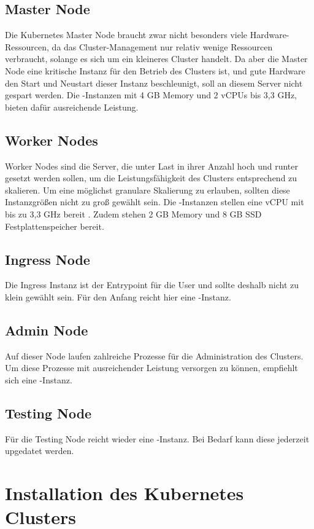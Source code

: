 \subsection{Master Node}
Die Kubernetes Master Node braucht zwar nicht besonders viele Hardware-Ressourcen,
da das Cluster-Management nur relativ wenige Ressourcen verbraucht,
solange es sich um ein kleineres Cluster handelt. Da aber die Master Node eine
kritische Instanz für den Betrieb des Clusters ist, und gute Hardware den
Start und Neustart dieser Instanz beschleunigt,
soll an diesem Server nicht gespart werden. Die -Instanzen mit
4 GB Memory und 2 vCPUs bis 3,3 GHz, bieten dafür ausreichende Leistung.

\subsection{Worker Nodes}
Worker Nodes sind die Server, die unter Last in ihrer Anzahl hoch und runter
gesetzt werden sollen,
um die Leistungsfähigkeit des Clusters entsprechend zu skalieren.
Um eine möglichst granulare Skalierung zu erlauben, sollten diese
Instanzgrößen nicht zu groß gewählt sein.
Die -Instanzen stellen eine vCPU mit bis zu 3,3 GHz bereit
\cite{Awst2}.
Zudem stehen 2 GB Memory und 8 GB SSD Festplattenspeicher bereit.

\subsection{Ingress Node}
Die Ingress Instanz ist der Entrypoint für die User und sollte deshalb
nicht zu klein gewählt sein. Für den Anfang reicht hier eine
-Instanz.

\subsection{Admin Node}
Auf dieser Node laufen zahlreiche Prozesse f\"ur die Administration des Clusters.
Um diese Prozesse mit ausreichender Leistung versorgen zu k\"onnen, empfiehlt sich
eine -Instanz.

\subsection{Testing Node}
Für die Testing Node reicht wieder eine -Instanz.
Bei Bedarf kann diese jederzeit upgedatet werden.



\section{Installation des Kubernetes Clusters}

